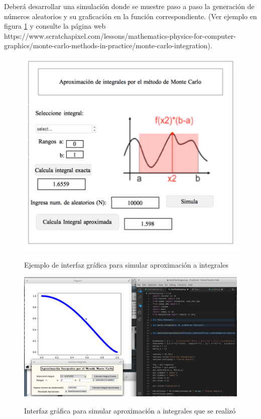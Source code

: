 \documentclass[runningheads,a4paper]{llncs}
\begin{document}
Deber\'a desarrollar una simulaci\'on donde se muestre paso a paso la generaci\'on de n\'umeros aleatorios y su graficaci\'on en la funci\'on correspondiente. (Ver ejemplo en figura \ref{fig:interfaz} y consulte la p\'agina web https://www.scratchapixel.com/lessons/mathematics-physics-for-computer-graphics/monte-carlo-methods-in-practice/monte-carlo-integration). 

\begin{figure}[H]
\centering
\includegraphics[scale=0.6]{Interfaz.png}
\label{fig:interfaz}
\caption{Ejemplo de interfaz gr\'afica para simular aproximaci\'on a integrales}
\end{figure}

\begin{figure}[H]
\centering
\includegraphics[scale=0.3]{interfazCreada.png}
\label{fig:Interfaz Hecha}
\caption{Interfaz gr\'afica para simular aproximaci\'on a integrales que se realiz\'o}
\end{figure}
\end{document}
